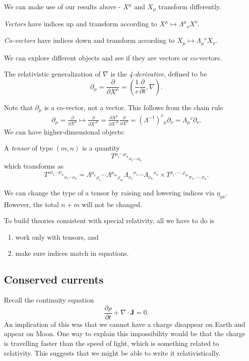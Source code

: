 \documentclass[a4paper]{article}
\begin{document}
We can make use of our results above - $X^\mu$ and $X_\mu$ transform differently.

\begin{defi}
  \emph{Vectors} have indices up and transform according to $X^\mu \mapsto \Lambda^\mu\!_\nu X^\nu$.

  \emph{Co-vectors} have indices down and transform according to $X_\mu \mapsto \Lambda_\mu\!^\nu X_\nu$.
\end{defi}

We can explore different objects and see if they are vectors or co-vectors.
\begin{defi}[4-derivative]
  The relativistic generalization of $\nabla$ is the \emph{4-derivative}, defined to be
  \[
    \partial_\mu = \frac{\partial}{\partial X^\mu} = \left(\frac{1}{c}\frac{\partial}{\partial t}, \nabla\right).
  \]
\end{defi}
Note that $\partial_\mu$ is a co-vector, not a vector. This follows from the chain rule
\begin{align*}
  \partial_\mu = \frac{\partial}{\partial X^\mu} \mapsto \frac{\partial}{\partial X'^\mu} = \frac{\partial X^\nu}{\partial X'^\mu}\frac{\partial}{\partial X^\nu} = (\Lambda^{-1})^\nu\!_\mu\partial_\nu = \Lambda_\mu\!^\nu \partial_\nu.
\end{align*}
We can have higher-dimensional objects:
\begin{defi}[Tensor]
  A \emph{tensor} of type $(m, n)$ is a quantity
  \[
    T^{\mu_1\cdots \mu_n}\!_{\nu_1\cdots \nu_n}
  \]
  which transforms as
  \[
    T'^{\mu_1\cdots \mu_n}\!_{\nu_1\cdots \nu_n} = \Lambda^{\mu_1}\!_{\rho_1} \cdots \Lambda^{\mu_m}\!_{\rho_m}\Lambda_{\nu_1}\!^{\sigma_1}\cdots\Lambda_{\nu_n}\!^{\sigma_n} \times T^{\rho_1, \cdots, \rho_m}\!_{\sigma_1, \cdots, \sigma_n}.
  \]
\end{defi}
We can change the type of a tensor by raising and lowering indices via $\eta_{\mu\nu}$. However, the total $n + m$ will not be changed.

To build theories consistent with special relativity, all we have to do is
\begin{enumerate}
  \item work only with tensors, and
  \item make sure indices match in equations.
\end{enumerate}

\subsection{Conserved currents}
Recall the continuity equation
\[
  \frac{\partial\rho}{\partial t} + \nabla\cdot \mathbf{J} = 0.
\]
An implication of this was that we cannot have a charge disappear on Earth and appear on Moon. One way to explain this impossibility would be that the charge is travelling faster than the speed of light, which is something related to relativity. This suggests that we might be able to write it relativistically.
\end{document}
